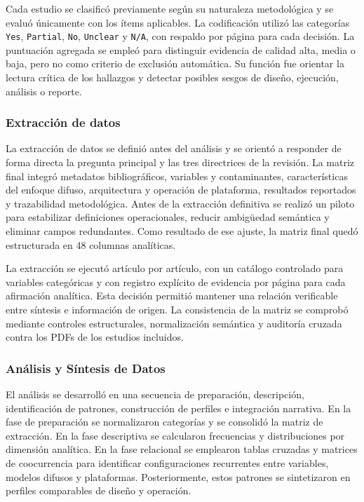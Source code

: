 Cada estudio se clasificó previamente según su naturaleza metodológica y se evaluó únicamente con los ítems aplicables. La codificación utilizó las categorías \texttt{Yes}, \texttt{Partial}, \texttt{No}, \texttt{Unclear} y \texttt{N/A}, con respaldo por página para cada decisión. La puntuación agregada se empleó para distinguir evidencia de calidad alta, media o baja, pero no como criterio de exclusión automática. Su función fue orientar la lectura crítica de los hallazgos y detectar posibles sesgos de diseño, ejecución, análisis o reporte.

\subsubsection{Extracción de datos}
La extracción de datos se definió antes del análisis y se orientó a responder de forma directa la pregunta principal y las tres directrices de la revisión. La matriz final integró metadatos bibliográficos, variables y contaminantes, características del enfoque difuso, arquitectura y operación de plataforma, resultados reportados y trazabilidad metodológica. Antes de la extracción definitiva se realizó un piloto para estabilizar definiciones operacionales, reducir ambigüedad semántica y eliminar campos redundantes. Como resultado de ese ajuste, la matriz final quedó estructurada en 48 columnas analíticas.

La extracción se ejecutó artículo por artículo, con un catálogo controlado para variables categóricas y con registro explícito de evidencia por página para cada afirmación analítica. Esta decisión permitió mantener una relación verificable entre síntesis e información de origen. La consistencia de la matriz se comprobó mediante controles estructurales, normalización semántica y auditoría cruzada contra los PDFs de los estudios incluidos.

\subsubsection{Análisis y Síntesis de Datos}
El análisis se desarrolló en una secuencia de preparación, descripción, identificación de patrones, construcción de perfiles e integración narrativa. En la fase de preparación se normalizaron categorías y se consolidó la matriz de extracción. En la fase descriptiva se calcularon frecuencias y distribuciones por dimensión analítica. En la fase relacional se emplearon tablas cruzadas y matrices de coocurrencia para identificar configuraciones recurrentes entre variables, modelos difusos y plataformas. Posteriormente, estos patrones se sintetizaron en perfiles comparables de diseño y operación.

